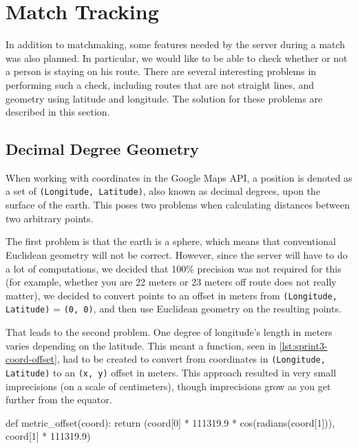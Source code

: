 \section{Match Tracking}
\label{sec:sprint3-gameserver}

In addition to matchmaking, some features needed by the server during a match was also planned. In particular, we would like to be able to check whether or not a person is staying on his route. There are several interesting problems in performing such a check, including routes that are not straight lines, and geometry using latitude and longitude. The solution for these problems are described in this section.

\subsection{Decimal Degree Geometry}

When working with coordinates in the Google Maps \ac{API}, a position is denoted as a set of \texttt{(Longitude, Latitude)}, also known as decimal degrees, upon the surface of the earth. This poses two problems when calculating distances between two arbitrary points.

The first problem is that the earth is a sphere, which means that conventional Euclidean geometry will not be correct. However, since the server will have to do a lot of computations, we decided that 100\% precision was not required for this (for example, whether you are 22 meters or 23 meters off route does not really matter), we decided to convert points to an offset in meters from \texttt{(Longitude, Latitude)} = \texttt{(0, 0)}, and then use Euclidean geometry on the resulting points.

That leads to the second problem. One degree of longitude's length in meters varies depending on the latitude\cite{wikidecimaldegrees}. This meant a function, seen in \autoref{lst:sprint3-coord-offset}, had to be created to convert from coordinates in \texttt{(Longitude, Latitude)} to an \texttt{(x, y)} offset in meters. This approach resulted in very small imprecisions (on a scale of centimeters), though imprecisions grow as you get further from the equator.

\begin{code}[label={lst:sprint3-coord-offset}, caption={Convert Decimal Degrees to Offset in Meters}, language={Python}]
def metric_offset(coord):
	return (coord[0] * 111319.9 * cos(radians(coord[1])), coord[1] * 111319.9)
\end{code}

